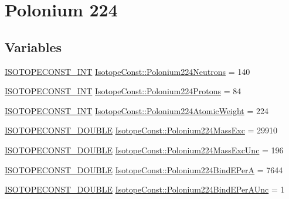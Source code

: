 \hypertarget{group___isotope_const-_polonium-_po224}{}\section{Polonium 224}
\label{group___isotope_const-_polonium-_po224}
\subsection*{Variables}
\begin{DoxyCompactItemize}
\item 
\mbox{\hyperlink{group___isotope_const-_macros_ga5f18360b3e99483a35c32d789e62621c}{I\+S\+O\+T\+O\+P\+E\+C\+O\+N\+S\+T\+\_\+\+I\+NT}} \mbox{\hyperlink{group___isotope_const-_polonium-_po224_ga7e5e070a26019727229faaa3cb8d9c7e}{Isotope\+Const\+::\+Polonium224\+Neutrons}} = 140
\item 
\mbox{\hyperlink{group___isotope_const-_macros_ga5f18360b3e99483a35c32d789e62621c}{I\+S\+O\+T\+O\+P\+E\+C\+O\+N\+S\+T\+\_\+\+I\+NT}} \mbox{\hyperlink{group___isotope_const-_polonium-_po224_ga4e575b030cf2cc451a7c84ddb7c892b8}{Isotope\+Const\+::\+Polonium224\+Protons}} = 84
\item 
\mbox{\hyperlink{group___isotope_const-_macros_ga5f18360b3e99483a35c32d789e62621c}{I\+S\+O\+T\+O\+P\+E\+C\+O\+N\+S\+T\+\_\+\+I\+NT}} \mbox{\hyperlink{group___isotope_const-_polonium-_po224_ga6310358f30f41c944de22b4fd02a2dc6}{Isotope\+Const\+::\+Polonium224\+Atomic\+Weight}} = 224
\item 
\mbox{\hyperlink{group___isotope_const-_macros_ga8f45a7272ce02c0b4c65c44636ed719a}{I\+S\+O\+T\+O\+P\+E\+C\+O\+N\+S\+T\+\_\+\+D\+O\+U\+B\+LE}} \mbox{\hyperlink{group___isotope_const-_polonium-_po224_gab2065455467da59bed63af88f6df5592}{Isotope\+Const\+::\+Polonium224\+Mass\+Exc}} = 29910
\item 
\mbox{\hyperlink{group___isotope_const-_macros_ga8f45a7272ce02c0b4c65c44636ed719a}{I\+S\+O\+T\+O\+P\+E\+C\+O\+N\+S\+T\+\_\+\+D\+O\+U\+B\+LE}} \mbox{\hyperlink{group___isotope_const-_polonium-_po224_ga94818721fa6996911eeb0b9c5d8f86b0}{Isotope\+Const\+::\+Polonium224\+Mass\+Exc\+Unc}} = 196
\item 
\mbox{\hyperlink{group___isotope_const-_macros_ga8f45a7272ce02c0b4c65c44636ed719a}{I\+S\+O\+T\+O\+P\+E\+C\+O\+N\+S\+T\+\_\+\+D\+O\+U\+B\+LE}} \mbox{\hyperlink{group___isotope_const-_polonium-_po224_ga022bee7c2dea91fc568aa18be8fd9ffb}{Isotope\+Const\+::\+Polonium224\+Bind\+E\+PerA}} = 7644
\item 
\mbox{\hyperlink{group___isotope_const-_macros_ga8f45a7272ce02c0b4c65c44636ed719a}{I\+S\+O\+T\+O\+P\+E\+C\+O\+N\+S\+T\+\_\+\+D\+O\+U\+B\+LE}} \mbox{\hyperlink{group___isotope_const-_polonium-_po224_ga7e411a13b2cdb09dbeda9b6b4f9aa2fc}{Isotope\+Const\+::\+Polonium224\+Bind\+E\+Per\+A\+Unc}} = 1

\end{DoxyCompactItemize}
